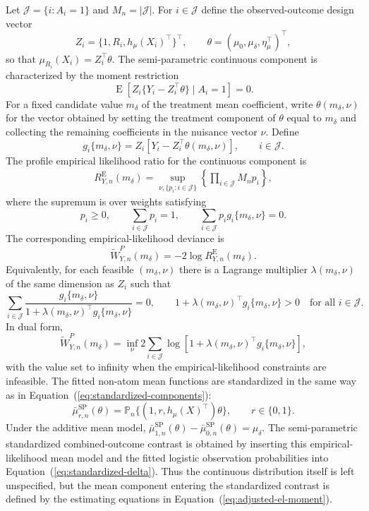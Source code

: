 \documentclass[11pt]{article}
\DeclareMathOperator*{\E}{E}
\begin{document}
Let $\mathcal{J} = \{i : A_i = 1\}$ and $M_n = |\mathcal{J}|$. For $i \in \mathcal{J}$ define the observed-outcome design vector
\[
  Z_i =
  \{1, R_i, h_\mu(X_i)^\top\}^\top,
  \qquad
  \theta =
  (\mu_0,\mu_\delta,\eta_\mu^\top)^\top,
\]
so that $\mu_{R_i}(X_i)=Z_i^\top\theta$. The semi-parametric continuous component is characterized by the moment restriction
\begin{equation}
  \E\!\left[
    Z_i\{Y_i-Z_i^\top\theta\}
    \mid A_i = 1
  \right] = 0.
  \label{eq:adjusted-el-moment}
\end{equation}
For a fixed candidate value $m_\delta$ of the treatment mean coefficient, write $\theta(m_\delta,\nu)$ for the vector obtained by setting the treatment component of $\theta$ equal to $m_\delta$ and collecting the remaining coefficients in the nuisance vector $\nu$. Define
\[
  g_i\{m_\delta,\nu\}
  =
  Z_i\left[Y_i-Z_i^\top\theta(m_\delta,\nu)\right],
  \qquad i \in \mathcal{J}.
\]
The profile empirical likelihood ratio for the continuous component is
\begin{align}
  R_{Y,n}^{\mathrm{E}}(m_\delta)
  =
  \sup_{\nu,\{p_i:i\in\mathcal{J}\}}
  \left\{
    \prod_{i \in \mathcal{J}} M_n p_i
  \right\},
  \label{eq:adjusted-el-primal}
\end{align}
where the supremum is over weights satisfying
\[
  p_i \geq 0,
  \qquad
  \sum_{i \in \mathcal{J}} p_i = 1,
  \qquad
  \sum_{i \in \mathcal{J}} p_i g_i\{m_\delta,\nu\}=0.
\]
The corresponding empirical-likelihood deviance is
\begin{equation}
  \widetilde{W}_{Y,n}^P(m_\delta)
  =
  -2\log R_{Y,n}^{\mathrm{E}}(m_\delta).
  \label{eq:adjusted-el-profile}
\end{equation}
Equivalently, for each feasible $(m_\delta,\nu)$ there is a Lagrange multiplier $\lambda(m_\delta,\nu)$ of the same dimension as $Z_i$ such that
\[
  \sum_{i \in \mathcal{J}}
  \frac{g_i\{m_\delta,\nu\}}
  {1+\lambda(m_\delta,\nu)^\top g_i\{m_\delta,\nu\}}
  =0,
  \qquad
  1+\lambda(m_\delta,\nu)^\top g_i\{m_\delta,\nu\} > 0
  \quad\text{for all }i\in\mathcal{J}.
\]
In dual form,
\begin{equation}
  \widetilde{W}_{Y,n}^P(m_\delta)
  =
  \inf_{\nu}
  2\sum_{i \in \mathcal{J}}
  \log\left[
    1+\lambda(m_\delta,\nu)^\top g_i\{m_\delta,\nu\}
  \right],
  \label{eq:adjusted-el-dual}
\end{equation}
with the value set to infinity when the empirical-likelihood constraints are infeasible. The fitted non-atom mean functions are standardized in the same way as in Equation~(\ref{eq:standardized-components}):
\[
  \bar{\mu}_{r,n}^{\mathrm{SP}}(\theta)
  =
  \mathbb{P}_n\{(1,r,h_\mu(X)^\top)\theta\},
  \qquad r\in\{0,1\}.
\]
Under the additive mean model, $\bar{\mu}_{1,n}^{\mathrm{SP}}(\theta)-\bar{\mu}_{0,n}^{\mathrm{SP}}(\theta)=\mu_\delta$. The semi-parametric standardized combined-outcome contrast is obtained by inserting this empirical-likelihood mean model and the fitted logistic observation probabilities into Equation~(\ref{eq:standardized-delta}). Thus the continuous distribution itself is left unspecified, but the mean component entering the standardized contrast is defined by the estimating equations in Equation~(\ref{eq:adjusted-el-moment}).
\end{document}
